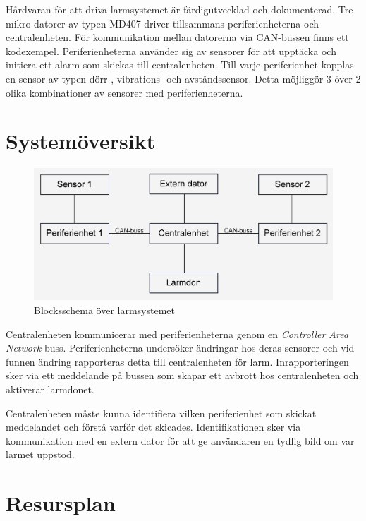 \documentclass[a4paper]{article}
\begin{document}
Hårdvaran för att driva larmsystemet är färdigutvecklad och dokumenterad. Tre mikro-datorer av typen MD407 driver tillsammans periferienheterna och centralenheten. För kommunikation mellan datorerna via CAN-bussen finns ett kodexempel. Periferienheterna använder sig av sensorer för att upptäcka och initiera ett alarm som skickas till centralenheten. Till varje periferienhet kopplas en sensor av typen dörr-, vibrations- och avståndssensor. Detta möjliggör 3 över 2 olika kombinationer av sensorer med periferienheterna.


\section{Systemöversikt}

\begin{figure}[H]
    \centering
    \includegraphics[width=\textwidth]{blockschema.png}
    \caption{Blocksschema över larmsystemet}
\end{figure}

Centralenheten kommunicerar med periferienheterna genom en \textit{Controller Area Network}-buss. Periferienheterna undersöker ändringar hos deras sensorer och vid funnen ändring rapporteras detta till centralenheten för larm. Inrapporteringen sker via ett meddelande på bussen som skapar ett avbrott hos centralenheten och aktiverar larmdonet.

Centralenheten måste kunna identifiera vilken periferienhet som skickat meddelandet och förstå varför det skicades. Identifikationen sker via kommunikation med en extern dator för att ge användaren en tydlig bild om var larmet uppstod.

\section{Resursplan}
\end{document}
